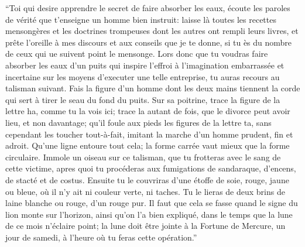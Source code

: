 \documentclass[a4paper, 11pt, oneside, polutonikogreek, german]{article}
\begin{document}
{\hspace*{0.5cm} "`Toi qui desire apprendre le secret de faire absorber les eaux, écoute les paroles de vérité que t'enseigne un homme bien instruit: laisse là toutes les recettes mensongères et les doctrines trompeuses dont les autres ont rempli leurs livres, et prête l'oreille à mes discours et aux conseils que je te donne, si tu ès du nombre de ceux qui ue suivent point le mensonge. Lors donc que tu voudras faire absorber les eaux d'un puits qui inspire l'effroi à l'imagination embarrassée et incertaine sur les moyens d'executer une telle entreprise, tu auras recours au talisman suivant. Fais la figure d'un homme dont les deux mains tiennent la corde qui sert à tirer le seau du fond du puits. Sur sa poitrine, trace la figure de la lettre ha, comme tu la vois ici; trace la autant de fois, que le divorce peut avoir lieu, et non davantage; qu'il foule aux pieds les figures de la lettre ta, sans cependant les toucher tout-à-fait, imitant la marche d'un homme prudent, fin et adroit. Qu'une ligne entoure tout cela; la forme carrée vaut mieux que la forme circulaire. Immole un oiseau sur ce talisman, que tu frotteras avec le sang de cette victime, apres quoi tu procéderas aux fumigations de sandaraque, d'encens, de stacté et de costus. Ensuite tu le couvriras d'une étoffe de soie, rouge, jaune ou bleue, où il n'y ait ni couleur verte, ni taches. Tu le lieras de deux brins de laine blanche ou rouge, d'un rouge pur. Il faut que cela se fasse quand le signe du lion monte sur l'horizon, ainsi qu'on l'a bien expliqué, dans le temps que la lune de ce mois n'éclaire point; la lune doit être jointe à la Fortune de Mercure, un jour de samedi, à l'heure où tu feras cette opération."'\\
}
\end{document}
